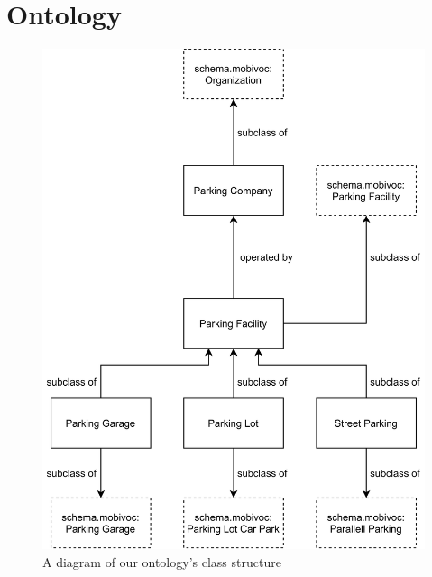 \chapter{Ontology}
\label{appendix:ontology}
\begin{figure}[H]
	\centering
	\includegraphics[scale=0.18]{figures/ontology-class.png}
	\caption{A diagram of our ontology's class structure}
\end{figure}


